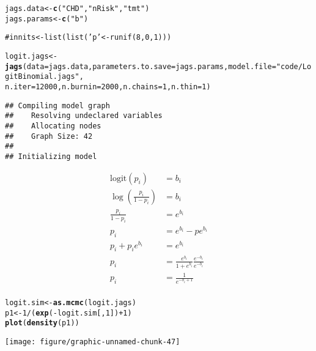 \documentclass[12pt,letterpaper,oneside]{article}\usepackage{graphicx, color}
\makeatletter
\newcommand{\hlfunctioncall}[1]{\textcolor[rgb]{0.501960784313725,0,0.329411764705882}{\textbf{#1}}}%
\newcommand{\hlstring}[1]{\textcolor[rgb]{0.6,0.6,1}{#1}}%
\newcommand{\hlcomment}[1]{\textcolor[rgb]{0.180392156862745,0.6,0.341176470588235}{#1}}%
\newenvironment{kframe}{%
 \def\at@end@of@kframe{}%
 \ifinner\ifhmode%
  \def\at@end@of@kframe{\end{minipage}}%
  \begin{minipage}{\columnwidth}%
 \fi\fi%
 \def\FrameCommand##1{\hskip\@totalleftmargin \hskip-\fboxsep
 \colorbox{shadecolor}{##1}\hskip-\fboxsep
     \hskip-\linewidth \hskip-\@totalleftmargin \hskip\columnwidth}%
 \MakeFramed {\advance\hsize-\width
   \@totalleftmargin\z@ \linewidth\hsize
   \@setminipage}}%
 {\par\unskip\endMakeFramed%
 \at@end@of@kframe}
\newenvironment{knitrout}{}{} %
\newcommand{\dateTaken}{January 7, 2013}
\makeatother
\begin{document}
\begin{knitrout}\scriptsize
{}\color{fgcolor}\begin{kframe}
\begin{alltt}
jags.data <- \hlfunctioncall{c}(\hlstring{"CHD"}, \hlstring{"nRisk"}, \hlstring{"tmt"})
jags.params <- \hlfunctioncall{c}(\hlstring{"b"})

\hlcomment{# innits <- list(list('p' <- runif(8,0,1)))}

logit.jags <- \hlfunctioncall{jags}(data = jags.data, parameters.to.save = jags.params, model.file = \hlstring{"code/LogitBinomial.jags"}, 
    n.iter = 12000, n.burnin = 2000, n.chains = 1, n.thin = 1)
\end{alltt}


{\ttfamily\noindent\itshape\color{messagecolor}{\#\# module glm loaded}}\begin{verbatim}
## Compiling model graph
##    Resolving undeclared variables
##    Allocating nodes
##    Graph Size: 42
## 
## Initializing model
\end{verbatim}
\end{kframe}
\end{knitrout}

\renewcommand{\dateTaken}{March 14, 2013}
\daysep
\begin{align*}
    \text{logit}(p_{i})&=b_{i}\\
    \log(\frac{p_{i}}{1-p_{i}})&=b_{i}\\
    \frac{p_{i}}{1-p_{i}}&=e^{b_{i}}\\
    p_{i} &= e^{b_{i}}-pe^{b_{i}}\\
    p_{i} + p_{i}e^{b_{i}}&=e^{b_{i}}\\
    p_{i} &= \frac{e^{b_{i}}}{1+e^{b_{i}}} \frac{e^{-b_{i}}}{e^{-b_{i}}}\\
    p_{i} &= \frac{1}{e^{-b_{i}+1}}\\
\end{align*}
\begin{knitrout}\scriptsize
{}\color{fgcolor}\begin{kframe}
\begin{alltt}
logit.sim <- \hlfunctioncall{as.mcmc}(logit.jags)
p1 <- 1/(\hlfunctioncall{exp}(-logit.sim[, 1]) + 1)
\hlfunctioncall{plot}(\hlfunctioncall{density}(p1))
\end{alltt}
\end{kframe}

{\centering \texttt{[image: figure/graphic-unnamed-chunk-47]} 

}



\end{knitrout}
\end{document}
